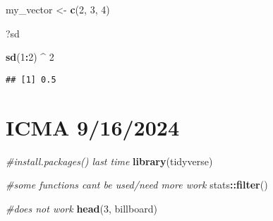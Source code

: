 \documentclass[
]{article}
\newenvironment{Shaded}{\begin{snugshade}}{\end{snugshade}}
\newcommand{\CommentTok}[1]{\textcolor[rgb]{0.56,0.35,0.01}{\textit{#1}}}
\newcommand{\DecValTok}[1]{\textcolor[rgb]{0.00,0.00,0.81}{#1}}
\newcommand{\FunctionTok}[1]{\textcolor[rgb]{0.13,0.29,0.53}{\textbf{#1}}}
\newcommand{\NormalTok}[1]{#1}
\newcommand{\OtherTok}[1]{\textcolor[rgb]{0.56,0.35,0.01}{#1}}
\newcommand{\SpecialCharTok}[1]{\textcolor[rgb]{0.81,0.36,0.00}{\textbf{#1}}}
\begin{document}
\begin{Shaded}
\begin{Highlighting}[]
\NormalTok{my\_vector }\OtherTok{\textless{}{-}} \FunctionTok{c}\NormalTok{(}\DecValTok{2}\NormalTok{, }\DecValTok{3}\NormalTok{, }\DecValTok{4}\NormalTok{)}
\end{Highlighting}
\end{Shaded}

\begin{Shaded}
\begin{Highlighting}[]
\NormalTok{?sd}
\end{Highlighting}
\end{Shaded}

\begin{Shaded}
\begin{Highlighting}[]
\FunctionTok{sd}\NormalTok{(}\DecValTok{1}\SpecialCharTok{:}\DecValTok{2}\NormalTok{) }\SpecialCharTok{\^{}} \DecValTok{2}
\end{Highlighting}
\end{Shaded}

\begin{verbatim}
## [1] 0.5
\end{verbatim}

\section{ICMA 9/16/2024}\label{icma-9162024}

\begin{Shaded}
\begin{Highlighting}[]
\CommentTok{\#install.packages() last time}
\FunctionTok{library}\NormalTok{(tidyverse)}
\end{Highlighting}
\end{Shaded}

\begin{Shaded}
\begin{Highlighting}[]
\CommentTok{\#some functions cant be used/need more work}
\NormalTok{stats}\SpecialCharTok{::}\FunctionTok{filter}\NormalTok{()}
\end{Highlighting}
\end{Shaded}

\begin{Shaded}
\begin{Highlighting}[]
\CommentTok{\#does not work}
\FunctionTok{head}\NormalTok{(}\DecValTok{3}\NormalTok{, billboard)}
\end{Highlighting}
\end{Shaded}
\end{document}
